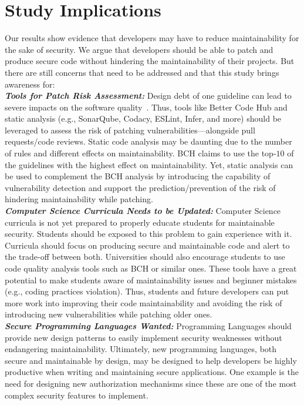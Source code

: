 \documentclass[smallextended]{svjour3}       %
\newcommand\Rui[1]{\nb{Rui}{blue}{#1}}
\begin{document}
\section{Study Implications}\label{sec:implications}
%
Our results show evidence that developers may have to reduce maintainability for the 
sake of security. We argue that developers should be able to patch and produce 
secure code without hindering the maintainability of their projects. But there are 
still concerns that need to be addressed and that this study brings awareness for:
%
\\\textit{\textbf{Tools for Patch Risk Assessment:}}
	Design debt of one guideline can lead
	to severe impacts on the software quality~\cite{10.1145/1985362.1985366}. 
	Thus, tools like Better Code Hub and static analysis (e.g., SonarQube, Codacy,
	ESLint, Infer, and more) should be leveraged to 
	assess the risk of patching vulnerabilities---alongside pull
  requests/code reviews. Static code analysis
	may be daunting due to the number of rules and different effects
	on maintainability. BCH claims to use the top-$10$ of the guidelines
	with the highest effect on maintainability. Yet, static analysis 
	can be used to complement the BCH analysis by introducing
	the capability of vulnerability detection and support the prediction/prevention of the risk of hindering maintainability while patching.
%
\\\textit{\textbf{Computer Science Curricula Needs to be Updated:}}
	Computer Science curricula is not yet prepared to properly educate students for maintainable security. 
	    Students should be exposed to this problem to gain experience with it. Curricula should focus on producing 
	    secure and maintainable code and alert to the trade-off between both.
	Universities should also encourage students to use code quality analysis tools such as BCH or similar ones. These tools have a great potential to make
	students aware of maintainability issues and beginner mistakes (e.g.,
	coding practices violation). Thus, students and future developers can 
	put more work into improving their code maintainability and avoiding the risk
	of introducing new vulnerabilities while patching older ones.
%	
\\\textit{\textbf{Secure Programming Languages Wanted:}} Programming Languages 
	should provide new design patterns to easily implement security weaknesses 
	without endangering maintainability.
	Ultimately, new programming languages, both secure and maintainable by design,
	may be designed to help developers be highly productive when writing and
	maintaining secure applications. One example is the need for designing new
	authorization mechanisms since these are one of the most complex security
	features to implement.
% 
\end{document}
